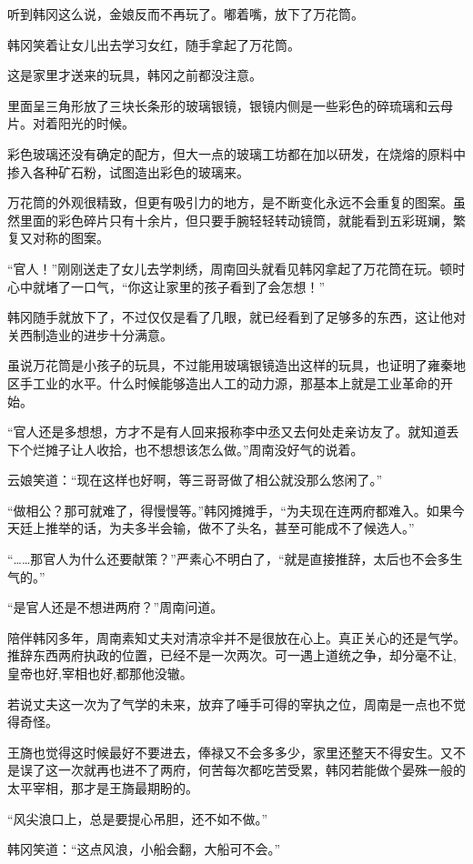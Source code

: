 听到韩冈这么说，金娘反而不再玩了。嘟着嘴，放下了万花筒。

韩冈笑着让女儿出去学习女红，随手拿起了万花筒。

这是家里才送来的玩具，韩冈之前都没注意。

里面呈三角形放了三块长条形的玻璃银镜，银镜内侧是一些彩色的碎琉璃和云母片。对着阳光的时候。

彩色玻璃还没有确定的配方，但大一点的玻璃工坊都在加以研发，在烧熔的原料中掺入各种矿石粉，试图造出彩色的玻璃来。

万花筒的外观很精致，但更有吸引力的地方，是不断变化永远不会重复的图案。虽然里面的彩色碎片只有十余片，但只要手腕轻轻转动镜筒，就能看到五彩斑斓，繁复又对称的图案。

“官人！”刚刚送走了女儿去学刺绣，周南回头就看见韩冈拿起了万花筒在玩。顿时心中就堵了一口气，“你这让家里的孩子看到了会怎想！”

韩冈随手就放下了，不过仅仅是看了几眼，就已经看到了足够多的东西，这让他对关西制造业的进步十分满意。

虽说万花筒是小孩子的玩具，不过能用玻璃银镜造出这样的玩具，也证明了雍秦地区手工业的水平。什么时候能够造出人工的动力源，那基本上就是工业革命的开始。

“官人还是多想想，方才不是有人回来报称李中丞又去何处走亲访友了。就知道丢下个烂摊子让人收拾，也不想想该怎么做。”周南没好气的说着。

云娘笑道：“现在这样也好啊，等三哥哥做了相公就没那么悠闲了。”

“做相公？那可就难了，得慢慢等。”韩冈摊摊手，“为夫现在连两府都难入。如果今天廷上推举的话，为夫多半会输，做不了头名，甚至可能成不了候选人。”

“……那官人为什么还要献策？”严素心不明白了，“就是直接推辞，太后也不会多生气的。”

“是官人还是不想进两府？”周南问道。

陪伴韩冈多年，周南素知丈夫对清凉伞并不是很放在心上。真正关心的还是气学。推辞东西两府执政的位置，已经不是一次两次。可一遇上道统之争，却分毫不让,皇帝也好,宰相也好,都那他没辙。

若说丈夫这一次为了气学的未来，放弃了唾手可得的宰执之位，周南是一点也不觉得奇怪。

王旖也觉得这时候最好不要进去，俸禄又不会多多少，家里还整天不得安生。又不是误了这一次就再也进不了两府，何苦每次都吃苦受累，韩冈若能做个晏殊一般的太平宰相，那才是王旖最期盼的。

“风尖浪口上，总是要提心吊胆，还不如不做。”

韩冈笑道：“这点风浪，小船会翻，大船可不会。”

